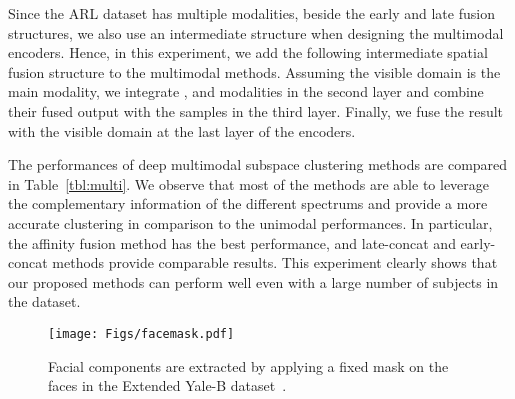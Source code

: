 \documentclass[journal]{IEEEtran}
\begin{document}
Since the ARL dataset has multiple modalities, beside the early and late fusion structures, we also use an intermediate structure when designing the multimodal encoders.		  Hence, in this experiment, we add the following intermediate spatial fusion structure to the multimodal methods.		 Assuming the visible domain is the main modality, we integrate ,  and  modalities in the second layer and combine their fused output with the  samples in the third layer.		  Finally, we fuse the result with the visible domain at the last layer of the encoders.


The performances of deep multimodal subspace clustering methods are compared in Table~\ref{tbl:multi}.		 We observe that most of the methods are able to leverage the complementary information of the different spectrums and provide a more accurate clustering in comparison to the unimodal performances.		  In particular, the affinity fusion method has the best performance, and late-concat and early-concat methods provide comparable results.		This experiment clearly shows that our proposed methods can perform well even with a large number of subjects in the dataset.

\begin{figure}[t]
 \centering \texttt{[image: Figs/facemask.pdf]}
\vskip -10pt\caption{Facial components are extracted by applying a fixed mask on the faces in the Extended Yale-B dataset~\cite{9ptsLight}.}
\label{fig:mask}
\end{figure}
\end{document}

